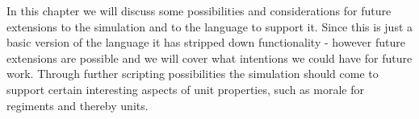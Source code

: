 In this chapter we will discuss some possibilities and considerations for future extensions to the simulation and to the language to support it.
Since this is just a basic version of the language it has stripped down functionality - however future extensions are possible and we will cover what intentions we could have for future work.
Through further scripting possibilities the simulation should come to support certain interesting aspects of unit properties, such as morale for regiments and thereby units.